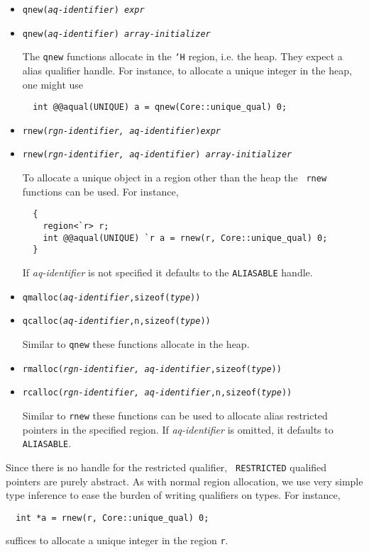 \begin{itemize}
\item \texttt{qnew({\it aq-identifier}) {\it expr}}
\item \texttt{qnew({\it aq-identifier}) {\it array-initializer}}

The {\tt qnew} functions allocate in the {\tt `H} region, i.e. the
 heap. They expect a alias qualifier handle. For instance, to allocate
 a unique integer in the heap, one might use

\begin{verbatim}
  int @@aqual(UNIQUE) a = qnew(Core::unique_qual) 0;
\end{verbatim}

\item \texttt{rnew({\it rgn-identifier, aq-identifier}){\it expr}}
\item \texttt{rnew({\it rgn-identifier, aq-identifier}){\it
    array-initializer}} 

To allocate a unique object in a region other than the heap the {\tt
rnew} functions can be used. For instance,

\begin{verbatim}
  {
    region<`r> r;
    int @@aqual(UNIQUE) `r a = rnew(r, Core::unique_qual) 0;
  }
\end{verbatim}
   
If {\it aq-identifier} is not specified it defaults to the {\tt ALIASABLE}
handle.

\item \texttt{qmalloc({\it aq-identifier},sizeof({\it type}))}
\item \texttt{qcalloc({\it aq-identifier},n,sizeof({\it type}))}

Similar to {\tt qnew} these functions allocate in the heap.

\item \texttt{rmalloc({\it rgn-identifier, aq-identifier},sizeof({\it type}))}
\item \texttt{rcalloc({\it rgn-identifier,
    aq-identifier},n,sizeof({\it type}))}

Similar to {\tt rnew} these functions can be used to allocate alias
restricted pointers in the specified region. If {\it aq-identifier} is
omitted, it defaults to {\tt ALIASABLE}.
\end{itemize}

Since there is no handle for the restricted qualifier, {\tt
  RESTRICTED} qualified pointers are purely abstract. As with normal
  region allocation, we use very simple type inference to ease the
  burden of writing qualifiers on types. For instance,
\begin{verbatim}
  int *a = rnew(r, Core::unique_qual) 0;
\end{verbatim}
suffices to allocate a unique integer in the region {\tt r}.

